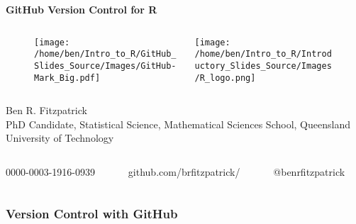 \documentclass[xcolor=dvipsnames]{beamer}
\begin{document}
\begin{frame} %
\textbf{\huge GitHub Version Control for R}\\

\begin{figure}
\begin{columns}
\begin{column}{5cm}
\begin{center}
\texttt{[image: /home/ben/Intro\_to\_R/GitHub\_Slides\_Source/Images/GitHub-Mark\_Big.pdf]}
\end{center}
\end{column} 
\begin{column}{5cm}
\begin{center}
\texttt{[image: /home/ben/Intro\_to\_R/Introductory\_Slides\_Source/Images/R\_logo.png]}
\end{center}
\end{column} 
\end{columns}

\end{figure}
\small Ben R. Fitzpatrick\\
\tiny PhD Candidate, Statistical Science, Mathematical Sciences School, Queensland University of Technology
\newline
\begin{columns}
\begin{column}{3cm}
\tiny 0000-0003-1916-0939
\end{column}
\begin{column}{3cm}
\tiny github.com/brfitzpatrick/
\end{column}
\begin{column}{3cm}
\tiny @benrfitzpatrick
\end{column}
\end{columns}
\end{frame}

\begin{frame} 
\frametitle{Version Control with GitHub}

\end{frame}
\end{document}
